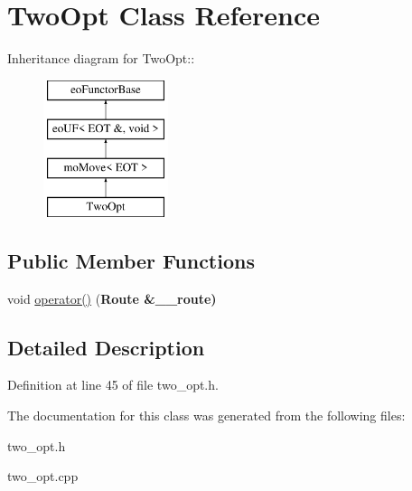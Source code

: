 \hypertarget{classTwoOpt}{
\section{Two\-Opt Class Reference}
\label{classTwoOpt}
}
Inheritance diagram for Two\-Opt::\begin{figure}[H]
\begin{center}
\leavevmode
\includegraphics[height=4cm]{classTwoOpt}
\end{center}
\end{figure}
\subsection*{Public Member Functions}
\begin{CompactItemize}
\item 
\hypertarget{classTwoOpt_ff87d1649a33d42a6d64e8d314ed1af0}{
void \hyperlink{classTwoOpt_ff87d1649a33d42a6d64e8d314ed1af0}{operator()} (\bf{Route} \&\_\-\_\-route)}
\label{classTwoOpt_ff87d1649a33d42a6d64e8d314ed1af0}

\end{CompactItemize}


\subsection{Detailed Description}




Definition at line 45 of file two\_\-opt.h.

The documentation for this class was generated from the following files:\begin{CompactItemize}
\item 
two\_\-opt.h\item 
two\_\-opt.cpp\end{CompactItemize}
